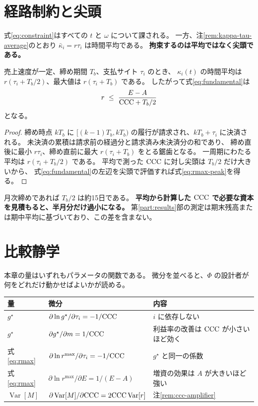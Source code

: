 \section{経路制約と尖頭}
\label{sec:peak}

式\eqref{eq:constraint}はすべての $t$ と $\omega$ について課される。
一方、注\ref{rem:kappa-tau-average}のとおり $\bar\kappa_i=r\tau_i$ は時間平均である。
\textbf{拘束するのは平均ではなく尖頭である。}

\begin{proposition}[尖頭の運転資本]
\label{prop:peak}
売上速度が一定、締め期間 $T_b$、支払サイト $\tau_i$ のとき、
$\kappa_i(t)$ の時間平均は $r(\tau_i+T_b/2)$、最大値は $r(\tau_i+T_b)$ である。
したがって式\eqref{eq:fundamental}は
\begin{equation}
r \ \leq\ \frac{E-A}{\mathrm{CCC} + T_b/2}
\label{eq:rmax-peak}
\end{equation}
となる。
\end{proposition}

\begin{proof}
締め時点 $kT_b$ に $[(k-1)T_b,kT_b)$ の履行が請求され、$kT_b+\tau_i$ に決済される。
未決済の累積は請求前の経過分と請求済み未決済分の和であり、
締め直後に最小 $r\tau_i$、締め直前に最大 $r(\tau_i+T_b)$ をとる鋸歯となる。
一周期にわたる平均は $r(\tau_i+T_b/2)$ である。
平均で測った $\mathrm{CCC}$ に対し尖頭は $T_b/2$ だけ大きいから、
式\eqref{eq:fundamental}の左辺を尖頭で評価すれば式\eqref{eq:rmax-peak}を得る。
\end{proof}

月次締めであれば $T_b/2$ は約15日である。
\textbf{平均から計算した $\mathrm{CCC}$ で必要な資本を見積もると、半月分だけ過小になる。}
第\ref{part:results}部の測定は期末残高または期中平均に基づいており、この差を含まない。

\section{比較静学}
\label{sec:comparative-statics}

本章の量はいずれもパラメータの関数である。
微分を並べると、$\Phi$ の設計者が何をどれだけ動かせばよいかが読める。

\begin{center}
\begin{tabularx}{\textwidth}{@{}llX@{}}
\toprule
量 & 微分 & 内容 \\
\midrule
$g^\star$ & $\partial\ln g^\star/\partial\tau_i = -1/\mathrm{CCC}$ & $i$ に依存しない \\
$g^\star$ & $\partial g^\star/\partial m = 1/\mathrm{CCC}$ & 利益率の改善は $\mathrm{CCC}$ が小さいほど効く \\
式\eqref{eq:rmax} & $\partial\ln r^{\max}/\partial\tau_i = -1/\mathrm{CCC}$ & $g^\star$ と同一の係数 \\
式\eqref{eq:rmax} & $\partial\ln r^{\max}/\partial E = 1/(E-A)$ & 増資の効果は $A$ が大きいほど強い \\
$\operatorname{Var}[M]$ & $\partial\operatorname{Var}[M]/\partial\mathrm{CCC} = 2\mathrm{CCC}\operatorname{Var}[r]$ & 注\ref{rem:ccc-amplifier} \\
\bottomrule
\end{tabularx}
\label{tab:comparative-statics}
\end{center}

